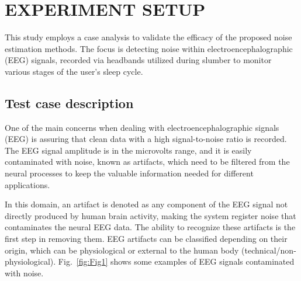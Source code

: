 \documentclass[conference]{IEEEtran}
\begin{document}
\section{EXPERIMENT SETUP}
\label{sec:exp}

This study employs a case analysis to validate the efficacy of the proposed noise estimation methods. The focus is detecting noise within electroencephalographic (EEG) signals, recorded via headbands utilized during slumber to monitor various stages of the user's sleep cycle.
\subsection{Test case description} One of the main concerns when dealing with electroencephalographic signals (EEG) is assuring that clean data with a high signal-to-noise ratio is recorded. The EEG signal amplitude is in the microvolts range, and it is easily contaminated with noise, known as artifacts, which need to be filtered from the neural processes to keep the valuable information needed for different applications.

In this domain, an artifact is denoted as any component of the EEG signal not directly produced by human brain activity, making the system register noise that contaminates the neural EEG data. The ability to recognize these artifacts is the first step in removing them. EEG artifacts can be classified depending on their origin, which can be physiological or external to the human body (technical/non-physiological). Fig.~\ref{fig:Fig1} shows some examples of EEG signals contaminated with noise.

\end{document}
